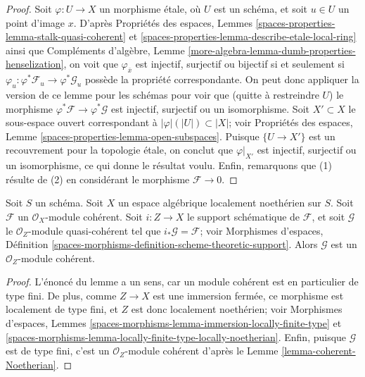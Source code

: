 \begin{proof}
Soit $\varphi : U \to X$ un morphisme \'etale, où $U$ est un schéma, et
soit $u \in U$ un point d'image $x$. D'après
Propriétés des espaces, Lemmes
\ref{spaces-properties-lemma-stalk-quasi-coherent} et
\ref{spaces-properties-lemma-describe-etale-local-ring}
ainsi que
Compléments d'algèbre, Lemme \ref{more-algebra-lemma-dumb-properties-henselization},
on voit que $\varphi_{\overline{x}}$ est injectif, surjectif ou bijectif
si et seulement si $\varphi_u : \varphi^*\mathcal{F}_u \to \varphi^*\mathcal{G}_u$
possède la propriété correspondante. On peut donc appliquer la version de
ce lemme pour les schémas pour voir que (quitte à restreindre $U$) le morphisme
$\varphi^*\mathcal{F} \to \varphi^*\mathcal{G}$ est injectif, surjectif
ou un isomorphisme. Soit $X' \subset X$ le sous-espace ouvert correspondant
à $|\varphi|(|U|) \subset |X|$; voir
Propriétés des espaces, Lemme \ref{spaces-properties-lemma-open-subspaces}.
Puisque $\{U \to X'\}$ est un recouvrement pour la topologie \'etale, on conclut
que $\varphi|_{X'}$ est injectif, surjectif ou un isomorphisme, ce qui donne le résultat voulu.
Enfin, remarquons que (1) résulte de (2) en considérant le morphisme
$\mathcal{F} \to 0$.
\end{proof}

\begin{lemma}
\label{lemma-coherent-support-closed}
Soit $S$ un schéma. Soit $X$ un espace algébrique localement noethérien sur $S$.
Soit $\mathcal{F}$ un $\mathcal{O}_X$-module cohérent. Soit $i : Z \to X$
le support schématique de $\mathcal{F}$, et soit $\mathcal{G}$
le $\mathcal{O}_Z$-module quasi-cohérent tel que
$i_*\mathcal{G} = \mathcal{F}$; voir
Morphismes d'espaces, Définition
\ref{spaces-morphisms-definition-scheme-theoretic-support}.
Alors $\mathcal{G}$ est un $\mathcal{O}_Z$-module cohérent.
\end{lemma}

\begin{proof}
L'énoncé du lemme a un sens, car un module cohérent est en
particulier de type fini. De plus, comme $Z \to X$ est une immersion fermée,
ce morphisme est localement de type fini, et $Z$ est donc localement noethérien; voir
Morphismes d'espaces, Lemmes
\ref{spaces-morphisms-lemma-immersion-locally-finite-type} et
\ref{spaces-morphisms-lemma-locally-finite-type-locally-noetherian}.
Enfin, puisque $\mathcal{G}$ est de type fini, c'est un
$\mathcal{O}_Z$-module cohérent d'après le
Lemme \ref{lemma-coherent-Noetherian}.
\end{proof}

